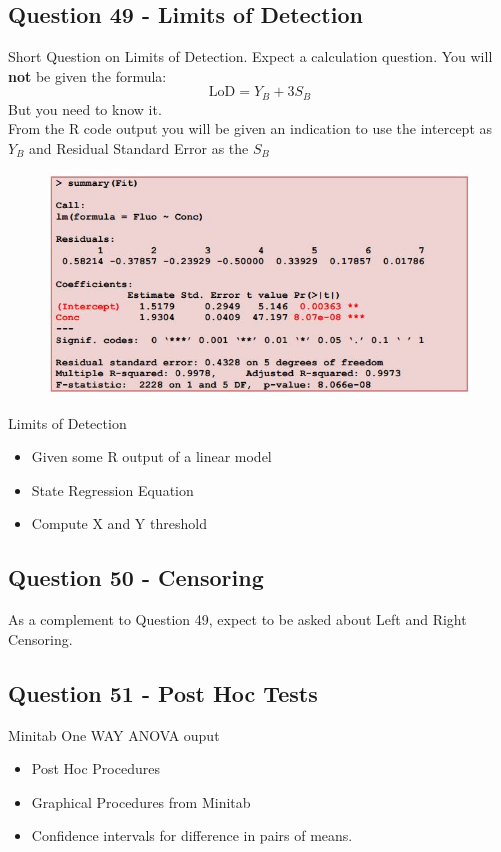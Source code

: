 \documentclass[a4paper,12pt]{article}
\begin{document}
\subsection*{Question 49 - Limits of Detection}
Short Question on Limits of Detection. Expect a calculation question. You will \textbf{not} be given the formula:
\[\mbox{LoD} = Y_B + 3S_B\]
But you need to know it.\\
From the R code output you will be given an indication to use the intercept  as $Y_B$ and  Residual Standard Error  as the $S_B$ %
\begin{figure}[h!]
\centering
\includegraphics[width=1.1\linewidth]{images/LoD}
\caption{}
\label{fig:LoD}
\end{figure}
Limits of Detection
\begin{itemize}
	\item Given some R output of a linear model
	\item State Regression Equation
	\item Compute X and Y threshold
\end{itemize}


\subsection*{Question 50 - Censoring}

As a complement to Question 49, expect to be asked about Left and Right Censoring.

\subsection*{Question 51 - Post Hoc Tests}
Minitab One WAY ANOVA ouput
\begin{itemize}
	\item Post Hoc Procedures
	\item Graphical Procedures from Minitab
	\item Confidence intervals for difference in pairs of means.

\end{itemize}
\end{document}
